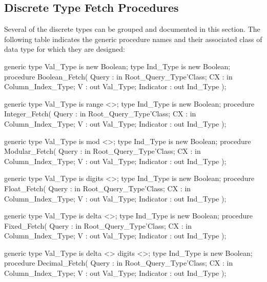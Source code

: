 \documentclass[english,letterpaper]{book}
\begin{document}
\subsection{Discrete Type Fetch Procedures}

Several of the discrete types can be grouped and documented in this
section. The following table indicates the generic procedure names
and their associated class of data type for which they are designed:

\begin{Code}
generic
   type Val_Type is new Boolean;
   type Ind_Type is new Boolean;
procedure Boolean_Fetch(
   Query :     in     Root_Query_Type'Class;
   CX :        in     Column_Index_Type;
   V :            out Val_Type;
   Indicator :    out Ind_Type
);
\end{Code}

\begin{Code}
generic
   type Val_Type is range <>;
   type Ind_Type is new Boolean;
procedure Integer_Fetch(
   Query :     in     Root_Query_Type'Class;
   CX :        in     Column_Index_Type;
   V :            out Val_Type;
   Indicator :    out Ind_Type
);
\end{Code}

\begin{Code}
generic
   type Val_Type is mod <>;
   type Ind_Type is new Boolean;
procedure Modular_Fetch(
   Query :     in     Root_Query_Type'Class;
   CX :        in     Column_Index_Type;
   V :            out Val_Type;
   Indicator :    out Ind_Type
);
\end{Code}

\begin{Code}
generic
   type Val_Type is digits <>;
   type Ind_Type is new Boolean;
procedure Float_Fetch(
   Query :     in     Root_Query_Type'Class;
   CX :        in     Column_Index_Type;
   V :            out Val_Type;
   Indicator :    out Ind_Type
);
\end{Code}

\begin{Code}
generic
   type Val_Type is delta <>;
   type Ind_Type is new Boolean;
procedure Fixed_Fetch(
   Query :     in     Root_Query_Type'Class;
   CX :        in     Column_Index_Type;
   V :            out Val_Type;
   Indicator :    out Ind_Type
);
\end{Code}

\begin{Code}
generic
   type Val_Type is delta <> digits <>;
   type Ind_Type is new Boolean;
procedure Decimal_Fetch(
   Query :     in     Root_Query_Type'Class;
   CX :        in     Column_Index_Type;
   V :            out Val_Type;
   Indicator :    out Ind_Type
);
\end{Code}
\end{document}
